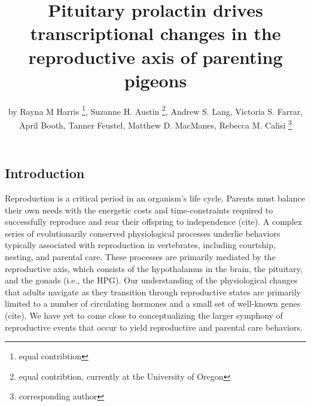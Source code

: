 \title{Pituitary prolactin drives transcriptional changes in the reproductive
axis of parenting pigeons}
\author{by Rayna M Harris \footnote{equal contribtion}, Suzanne H. Austin \footnote{equal contribtion, currently at the
  University of Oregon}, Andrew S. Lang, Victoria S. Farrar, April Booth, Tanner Feustel, Matthew D. MacManes, Rebecca M. Calisi \footnote{corresponding author}}

\maketitle



\hypertarget{introduction}{%
\subsection{Introduction}\label{introduction}}

Reproduction is a critical period in an organism's life cycle. Parents
must balance their own needs with the energetic costs and
time-constraints required to successfully reproduce and rear their
offspring to independence (cite). A complex series of evolutionarily
conserved physiological processes underlie behaviors typically
associated with reproduction in vertebrates, including courtship,
nesting, and parental care. These processes are primarily mediated by
the reproductive axis, which consists of the hypothalamus in the brain,
the pituitary, and the gonads (i.e., the HPG). Our understanding of the
physiological changes that adults navigate as they transition through
reproductive states are primarily limited to a number of circulating
hormones and a small set of well-known genes (cite). We have yet to come
close to conceptualizing the larger symphony of reproductive events that
occur to yield reproductive and parental care behaviors.

